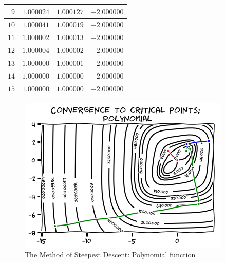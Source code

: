 \begin{example}
\begin{itemize}
\begin{center}
\begin{tabular}{|r|r|r|r|}
	$9$ & $1.000024$ & $1.000127$ & $-2.000000$ \\ \hline 
	$10$ & $1.000041$ & $1.000019$ & $-2.000000$ \\ \hline 
	$11$ & $1.000002$ & $1.000013$ & $-2.000000$ \\ \hline 
	$12$ & $1.000004$ & $1.000002$ & $-2.000000$ \\ \hline 
	$13$ & $1.000000$ & $1.000001$ & $-2.000000$ \\ \hline 
	$14$ & $1.000000$ & $1.000000$ & $-2.000000$ \\ \hline 
	$15$ & $1.000000$ & $1.000000$ & $-2.000000$ \\ \hline 
	\end{tabular}
	\end{center}
\end{itemize}
\begin{figure}[ht!]
\includegraphics[width=0.7\linewidth]{images/convergenceSteepest.png}
\caption{The Method of Steepest Descent: Polynomial function}
\label{figure:SteepestConvergenceP}
\end{figure}
\end{example}

